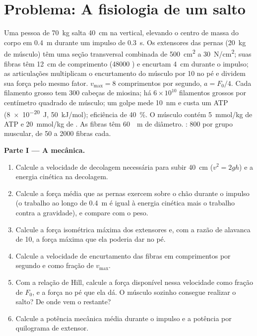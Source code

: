 \section{Problema: A fisiologia de um salto}

\begin{problem}
\label{pb:b2:muscle-movement:1}
Uma pessoa de \qty{70}{kg} salta \qty{40}{cm} na vertical, elevando o
centro de massa do corpo em \qty{0.4}{m} durante um impulso de
\qty{0.3}{s}. Os extensores das pernas (\qty{20}{kg} de músculo) têm uma
seção transversal combinada de \qty{500}{cm^2} a \qty{30}{N/cm^2}; suas
fibras têm \qty{12}{cm} de comprimento (\num{48000} ) e
encurtam \qty{4}{cm} durante o impulso; as articulações multiplicam o
encurtamento do músculo por \num{10} no pé e dividem sua força pelo
mesmo fator. $v_{\max} = 8$ comprimentos por segundo, $a = F_0/4$. Cada
filamento grosso tem \num{300} cabeças de miosina; há $6\times
10^{10}$ filamentos grossos por centímetro quadrado de músculo; um golpe
mede \qty{10}{nm} e custa um ATP (\qty{8e-20}{J}, \qty{50}{kJ/mol});
eficiência de \qty{40}{\%}. O músculo contém \qty{5}{mmol/kg} de ATP e
\qty{20}{mmol/kg} de . As fibras têm \qty{60}{\micro
m} de diâmetro. : \num{800} por grupo muscular, de
\num{50} a \num{2000} fibras cada.

\medskip
\noindent\textbf{Parte I --- A mecânica.}
\begin{enumerate}
  \item Calcule a velocidade de decolagem necessária para subir
        \qty{40}{cm} ($v^{2} = 2gh$) e a energia cinética na decolagem.
  \item Calcule a força média que as pernas exercem sobre o chão durante
        o impulso (o trabalho ao longo de \qty{0.4}{m} é igual à energia
        cinética mais o trabalho contra a gravidade), e compare com o
        peso.
  \item Calcule a força isométrica máxima dos extensores e, com a razão
        de alavanca de 10, a força máxima que ela poderia dar no pé.
  \item Calcule a velocidade de encurtamento das fibras em comprimentos
        por segundo e como fração de $v_{\max}$.
  \item Com a relação de Hill, calcule a força disponível nessa
        velocidade como fração de $F_0$, e a força no pé que ela dá. O
        músculo sozinho consegue realizar o salto? De onde vem o
        restante?
  \item Calcule a potência mecânica média durante o impulso e a potência
        por quilograma de extensor.
\end{enumerate}


\end{problem}
